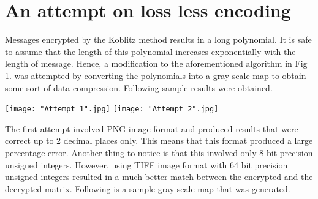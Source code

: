 \documentclass[a4paper,12pt]{article}
\begin{document}


\section{An attempt on loss less encoding}
Messages encrypted by the Koblitz method results in a long polynomial. It is safe to assume that the length of this polynomial increases exponentially with the length of message. Hence, a modification to the aforementioned algorithm in Fig 1. was attempted by converting the polynomials into a gray scale map to obtain some sort of data compression. Following sample results were obtained.

\begin{center}
		\texttt{[image: "Attempt 1".jpg]}
		\texttt{[image: "Attempt 2".jpg]}
\end{center}

\begin{flushleft}
The first attempt involved PNG image format and produced results that were correct up to 2 decimal places only. This means that this format produced a large percentage error. Another thing to notice is that this involved only 8 bit precision unsigned integers. However, using TIFF image format with 64 bit precision unsigned integers resulted in a much better match between the encrypted and the decrypted matrix. Following is a sample gray scale map that was generated.
\end{flushleft}
\end{document}
